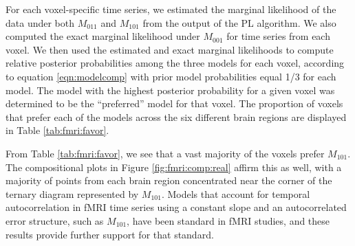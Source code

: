 For each voxel-specific time series, we estimated the marginal likelihood of the data under both $M_{011}$ and $M_{101}$ from the output of the PL algorithm. We also computed the exact marginal likelihood under $M_{001}$ for time series from each voxel. We then used the estimated and exact marginal likelihoods to compute relative posterior probabilities among the three models for each voxel, according to equation \eqref{eqn:modelcomp} with prior model probabilities equal 1/3 for each model. The model with the highest posterior probability for a given voxel was determined to be the ``preferred'' model for that voxel. The proportion of voxels that prefer each of the models across the six different brain regions are displayed in Table \ref{tab:fmri:favor}.

From Table \ref{tab:fmri:favor}, we see that a vast majority of the voxels prefer $M_{101}$. The compositional plots in Figure \ref{fig:fmri:comp:real} affirm this as well, with a majority of points from each brain region concentrated near the corner of the ternary diagram represented by $M_{101}$. Models that account for temporal autocorrelation in fMRI time series using a constant slope and an autocorrelated error structure, such as $M_{101}$, have been standard in fMRI studies, and these results provide further support for that standard.


